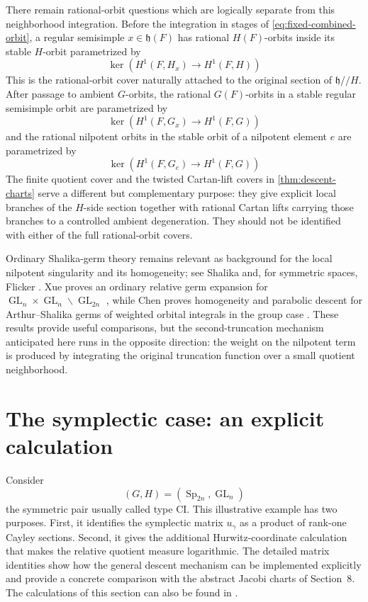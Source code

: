 \documentclass[11pt]{amsart}
\theoremstyle{definition}
\theoremstyle{remark}
\newcommand{\GL}{\operatorname{GL}}
\newcommand{\Sp}{\operatorname{Sp}}
\newcommand{\h}{\mathfrak h}
\begin{document}
There remain rational-orbit questions which are logically separate from this
neighborhood integration.  Before the integration in stages of
\eqref{eq:fixed-combined-orbit}, a regular semisimple $x\in\h(F)$ has rational
$H(F)$-orbits inside its stable $H$-orbit parametrized by
\[
 \ker\left(H^1(F,H_x)\longrightarrow H^1(F,H)\right)
\]
This is the rational-orbit cover naturally attached to the original section
of $\h/\!/H$.  After passage to ambient $G$-orbits, the rational $G(F)$-orbits
in a stable regular semisimple orbit are parametrized by
\[
 \ker\left(H^1(F,G_x)\longrightarrow H^1(F,G)\right)
\]
and the rational nilpotent orbits in the stable orbit of a nilpotent element
$e$ are parametrized by
\[
 \ker\left(H^1(F,G_e)\longrightarrow H^1(F,G)\right)
\]
The finite quotient cover and the twisted Cartan-lift covers in
\cref{thm:descent-charts} serve a different but complementary purpose: they
give explicit local branches of the $H$-side section together with rational
Cartan lifts carrying those branches to a controlled ambient degeneration.
They should not be identified with either of the full rational-orbit covers.

Ordinary Shalika-germ theory remains relevant as background for the local
nilpotent singularity and its homogeneity; see Shalika \cite{Shalika} and, for
symmetric spaces, Flicker \cite{Flicker}.  Xue proves an ordinary relative
germ expansion for $\GL_n\times\GL_n\backslash\GL_{2n}$ \cite{Xue}, while
Chen proves homogeneity and parabolic descent for Arthur--Shalika germs of
weighted orbital integrals in the group case \cite{ChenWeighted}.  These
results provide useful comparisons, but the second-truncation mechanism
anticipated here runs in the opposite direction: the weight on the nilpotent
term is produced by integrating the original truncation function over a
small quotient neighborhood.

\section{The symplectic case: an explicit calculation}

Consider
\[
 (G,H)=(\Sp_{2n},\GL_n)
\]
the symmetric pair usually called type CI.  This illustrative example has
two purposes.  First, it identifies the
symplectic matrix $u_\gamma$ as a product of rank-one Cayley sections.
Second, it gives the additional Hurwitz-coordinate calculation that makes the
relative quotient measure logarithmic.  The detailed matrix identities show how the general descent mechanism can
be implemented explicitly and provide a concrete comparison with the abstract
Jacobi charts of Section~8.  The calculations of this section can also be found
in \cite{SparlingThesis}.
\end{document}
